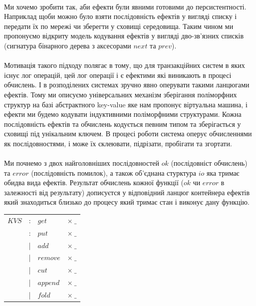 \documentclass[11pt,oneside]{article}
\begin{document}
   \paragraph{}
   Ми хочемо зробити так, аби ефекти були явними готовими до персистентності.
   Наприклад щоби можно було взяти послідовність ефектів у вигляді списку і
   передати їх по мережі чи зберегти у сховищі середовища. Таким чином ми
   пропонуємо відкриту модель кодування ефектів у вигляді дво-зв’язних
   списків (сигнатура бінарного дерева з аксесорами $next$ та $prev$).

   \paragraph{}
   Мотивація такого підходу полягає в тому, що для транзакційних систем
   в яких існує лог операцій, цей лог операції і є ефектими які виникають в процесі обчислень.
   І в розподілених системах зручно явно оперувати такими ланцюгами ефектів.
   Тому ми описуємо універсальних механізм зберігання поліморфних структур
   на базі абстрактного key-value яке нам пропонує віртуальна машина, і ефекти
   ми будемо кодувати індуктивними поліморфними структурами. Кожна послідовність ефектів та обчислень
   кодується певним типом та зберігається у сховищі під унікальним ключем. В процесі роботи
   система оперує обчисленнями як послідовностями, і може їх склеювати, підрізати,
   пробігати та згортати.

   \paragraph{}
   Ми почнемо з двох найголовніших послідовностей $ok$ (послідовніст обчислень)
   та $error$ (послідовність помилок), а також об’єднана стурктура $io$ яка тримає
   обидва вида ефектів. Результат обчислень кожної функції ($ok$ чи $error$ в залежності від результату)
   дописуєтся у відповідний ланцюг контейнера ефектів який знаходиться близько до
   процесу який тримає стан і виконує дану функцію.

\begin{center}
\begin{tabular}{llll}
$KVS$     &:& $get$    & $\times\ \_$          \\
          &:& $put$     & $\times\ \_$          \\
          &|& $add$     & $\times\ \_$          \\
          &|& $remove$  & $\times\ \_$          \\
          &|& $cut$     & $\times\ \_$          \\
          &|& $append$  & $\times\ \_$          \\
          &|& $fold$    & $\times\ \_$         \\
\end{tabular}
\end{center}
\end{document}
